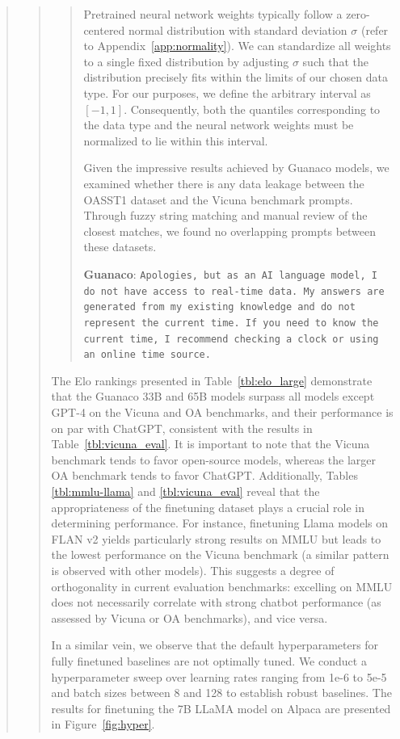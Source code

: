 \begin{quote}
\begin{quote}
\begin{quote}
Pretrained neural network weights typically follow a zero-centered normal distribution with standard deviation $\sigma$ (refer to Appendix~\ref{app:normality}). We can standardize all weights to a single fixed distribution by adjusting $\sigma$ such that the distribution precisely fits within the limits of our chosen data type. For our purposes, we define the arbitrary interval as $[-1, 1]$. Consequently, both the quantiles corresponding to the data type and the neural network weights must be normalized to lie within this interval.

Given the impressive results achieved by {Guanaco} models, we examined whether there is any data leakage between the OASST1 dataset and the Vicuna benchmark prompts. Through fuzzy string matching and manual review of the closest matches, we found no overlapping prompts between these datasets.

    \textbf{Guanaco}: \texttt{Apologies, but as an AI language model, I do not have access to real-time data. My answers are generated from my existing knowledge and do not represent the current time. If you need to know the current time, I recommend checking a clock or using an online time source.}
\end{quote}

The Elo rankings presented in Table~\ref{tbl:elo_large} demonstrate that the {Guanaco} 33B and 65B models surpass all models except GPT-4 on the Vicuna and OA benchmarks, and their performance is on par with ChatGPT, consistent with the results in Table~\ref{tbl:vicuna_eval}. It is important to note that the Vicuna benchmark tends to favor open-source models, whereas the larger OA benchmark tends to favor ChatGPT. Additionally, Tables \ref{tbl:mmlu-llama} and \ref{tbl:vicuna_eval} reveal that the appropriateness of the finetuning dataset plays a crucial role in determining performance. For instance, finetuning Llama models on FLAN v2 yields particularly strong results on MMLU but leads to the lowest performance on the Vicuna benchmark (a similar pattern is observed with other models). This suggests a degree of orthogonality in current evaluation benchmarks: excelling on MMLU does not necessarily correlate with strong chatbot performance (as assessed by Vicuna or OA benchmarks), and vice versa.

In a similar vein, we observe that the default hyperparameters for fully finetuned baselines are not optimally tuned. We conduct a hyperparameter sweep over learning rates ranging from 1e-6 to 5e-5 and batch sizes between 8 and 128 to establish robust baselines. The results for finetuning the 7B LLaMA model on Alpaca are presented in Figure~\ref{fig:hyper}.


\end{quote}
\end{quote}
